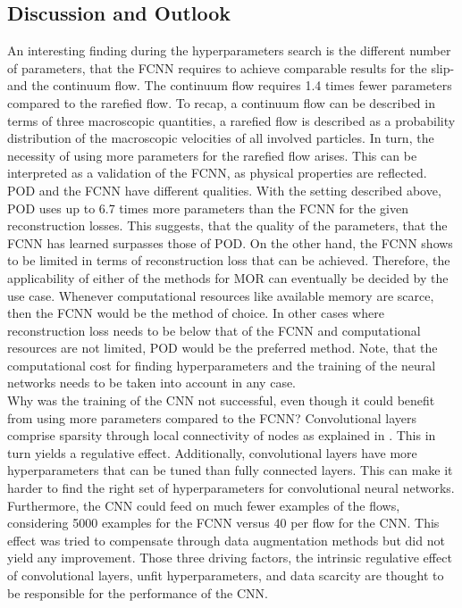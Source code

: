 \subsection{Discussion and Outlook}
An interesting finding during the hyperparameters search is the different number of parameters, that the FCNN requires to achieve comparable results for the slip- and the continuum flow. The continuum flow requires 1.4 times fewer parameters compared to the rarefied flow. To recap, a continuum flow can be described in terms of three macroscopic quantities, a rarefied flow is described as a probability distribution of the macroscopic velocities of all involved particles. In turn, the necessity of using more parameters for the rarefied flow arises. This can be interpreted as a validation of the FCNN, as physical properties are reflected.\\
POD and the FCNN have different qualities. With the setting described above, POD uses up to 6.7 times more parameters than the FCNN for the given reconstruction losses. This suggests, that the quality of the parameters, that the FCNN has learned surpasses those of POD. On the other hand, the FCNN shows to be limited in terms of reconstruction loss that can be achieved. Therefore, the applicability of either of the methods for MOR can eventually be decided by the use case. Whenever computational resources like available memory are scarce, then the FCNN would be the method of choice. In other cases where reconstruction loss needs to be below that of the FCNN and computational resources are not limited, POD would be the preferred method. Note, that the computational cost for finding hyperparameters and the training of the neural networks needs to be taken into account in any case.\\
Why was the training of the CNN not successful, even though it could benefit from using more parameters compared to the FCNN? Convolutional layers comprise sparsity through local connectivity of nodes as explained in \cite{Goodfellow}. This in turn yields a regulative effect. Additionally, convolutional layers have more hyperparameters that can be tuned than fully connected layers. This can make it harder to find the right set of hyperparameters for convolutional neural networks. Furthermore, the CNN could feed on much fewer examples of the flows, considering 5000 examples for the FCNN versus 40 per flow for the CNN. This effect was tried to compensate through data augmentation methods but did not yield any improvement. Those three driving factors, the intrinsic regulative effect of convolutional layers, unfit hyperparameters, and data scarcity are thought to be responsible for the performance of the CNN.\\

